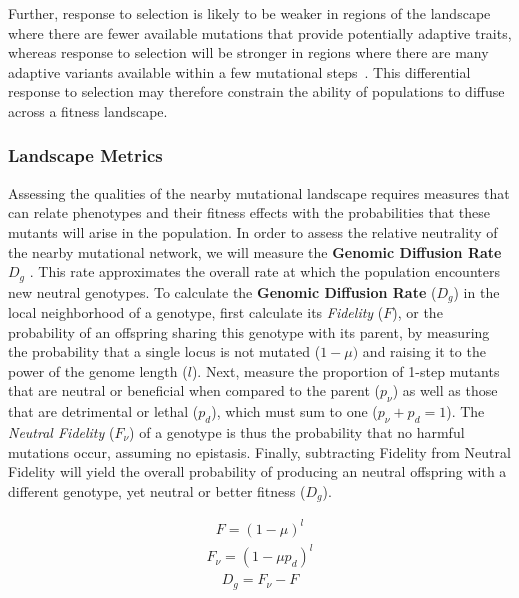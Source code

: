 \documentclass[10pt,letterpaper]{article}
\begin{document}
Further, response to selection is likely to be weaker in regions of the landscape where there are fewer available mutations that provide potentially adaptive traits, whereas response to selection will be stronger in regions where there are many adaptive variants available within a few mutational steps~\cite{alberch_genes_1991,carter_role_2005}. This differential response to selection may therefore constrain the ability of populations to diffuse across a fitness landscape.

\subsubsection*{Landscape Metrics}
Assessing the qualities of the nearby mutational landscape requires measures that can relate phenotypes and their fitness effects with the probabilities that these mutants will arise in the population. In order to assess the relative neutrality of the nearby mutational network, we will measure the \textbf{Genomic Diffusion Rate} $D_g$ \cite{ofria_evolution_2002}. This rate approximates the overall rate at which the population encounters new neutral genotypes.
To calculate the \textbf{Genomic Diffusion Rate} ($D_g$) in the local neighborhood of a genotype, first calculate its \textit{Fidelity} ($F$), or the probability of an offspring sharing this genotype with its parent, by measuring the probability that a single locus is not mutated ($1-\mu)$ and raising it to the power of the genome length ($l$). Next, measure the proportion of 1-step mutants that are neutral or beneficial when compared to the parent ($p_\nu$) as well as those that are detrimental or lethal ($p_d$), which must sum to one ($p_\nu + p_d = 1$).  The \textit{Neutral Fidelity} ($F_\nu$) of a genotype is thus the probability that no harmful mutations occur, assuming no epistasis. Finally, subtracting Fidelity from Neutral Fidelity will yield the overall probability of producing an neutral offspring with a different genotype, yet neutral or better fitness ($D_g$).

	\begin{eqnarray}
	\label{eq:fidelity}
		F = (1 - \mu)^l
	\end{eqnarray}
	\begin{eqnarray}
	\label{eq:neutral_fidelity}
		F_\nu = (1 - \mu p_d)^l
	\end{eqnarray}
	\begin{eqnarray}
	\label{eq:genomic_diffusion_rate}
		D_g = F_\nu - F
	\end{eqnarray}
\end{document}

